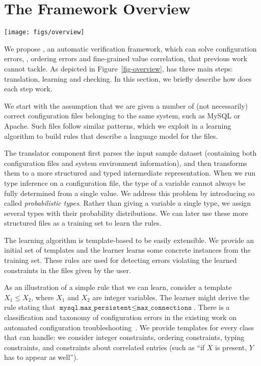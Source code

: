 
\section{The \app Framework Overview}

\begin{figure*}[tbp] \centering
\texttt{[image: figs/overview]}
\caption{\app's workflow. The green components represent configuration 
  files, including both sample configuration datasets and users' input
  configuration files to verify. 
  The purple components are the modules of \app.
  Because template DB is not necessarily used, we use dashed
  arrow between it and the learner.
  Red boxes are sub-modules within the checker.
  The yellow components are results generated by \app's modules.}
\label{fig-overview}
\end{figure*}

We propose \app, an automatic verification framework,
which can solve configuration errors, \eg, ordering errors
and fine-grained value correlation, that previous work cannot tackle.
As depicted in Figure~\ref{fig-overview}, \app has three main steps:
translation, learning and checking. In this section, we briefly
describe how does each step work.

We start
with the assumption that we are given a number of (not necessarily) 
correct configuration files belonging to the same system, 
such as MySQL or Apache. 
Such files follow similar patterns, which we exploit
in a learning algorithm to build rules that
describe a language model for the files.

The translator component first parses the input sample 
dataset (containing both configuration files and system environment
information), and then transforms them to a more structured
and typed intermediate representation.
When we run type inference on a configuration file, 
the type of a variable cannot always be fully determined from 
a single value.
We address this problem 
by introducing so called {\em probabilistic types}.
Rather than giving a variable a single type, 
we assign several types with their probability distributions. 
We can later use these more structured files
as a training set to learn the rules. 

The learning algorithm is template-based to be easily extensible. 
We provide an initial set of templates and the
learner learns some concrete instances from the training set. These
rules are used for detecting errors violating the learned constraints
in the files given by the user.

As an illustration of a simple rule that we can learn, consider a template
 $X_1 \le X_2$, where $X_1$ and $X_2$ are
integer variables. The learner might derive the rule stating that
$\texttt{mysql.max\_persistent} \le \texttt{max\_connections}$. There is a classification and taxonomy of configuration errors in the 
existing work on automated configuration troubleshooting~\cite{yin11anempirical, configdataset}. We provide templates for every class that \app can handle: we consider integer constraints, ordering
constraints, typing constraints, and constraints about correlated entries (such as ``if $X$ is present, $Y$ has to appear as well''). 


